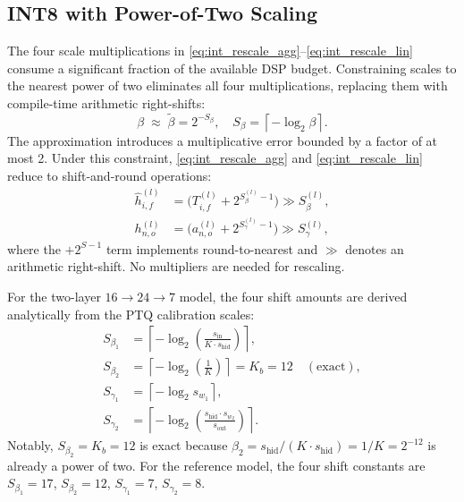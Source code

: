 \documentclass{IEEEtran}
\begin{document}
\subsection{INT8 with Power-of-Two Scaling}
\label{sec:po2}

The four scale multiplications in \eqref{eq:int_rescale_agg}--\eqref{eq:int_rescale_lin} consume a significant fraction of the available DSP budget. Constraining scales to the nearest power of two eliminates all four multiplications, replacing them with compile-time arithmetic right-shifts:
\begin{equation}
    \beta \;\approx\; \tilde{\beta} = 2^{-S_\beta},\quad
    S_\beta = \left\lceil -\log_2\beta \right\rceil.
    \label{eq:po2_approx}
\end{equation}
The approximation introduces a multiplicative error bounded by a factor of at most 2. Under this constraint, \eqref{eq:int_rescale_agg} and \eqref{eq:int_rescale_lin} reduce to shift-and-round operations:
\begin{align}
    \hat{h}_{i,f}^{(l)} &= \bigl(T_{i,f}^{(l)} + 2^{S_{\beta}^{(l)}-1}\bigr) \gg S_{\beta}^{(l)}, \label{eq:po2_agg}\\
    h_{n,o}^{(l)} &= \bigl(a_{n,o}^{(l)} + 2^{S_{\gamma}^{(l)}-1}\bigr) \gg S_{\gamma}^{(l)}, \label{eq:po2_lin}
\end{align}
where the $+2^{S-1}$ term implements round-to-nearest and $\gg$ denotes an arithmetic right-shift. No multipliers are needed for rescaling.

For the two-layer $16{\to}24{\to}7$ model, the four shift amounts are derived analytically from the PTQ calibration scales:
\begin{align}
    S_{\beta_1} &= \left\lceil-\log_2\!\left(\tfrac{s_{\mathrm{in}}}{K\cdot s_{\mathrm{hid}}}\right)\right\rceil, \label{eq:shift_beta1}\\
    S_{\beta_2} &= \left\lceil-\log_2\!\left(\tfrac{1}{K}\right)\right\rceil = K_b = 12\quad(\text{exact}), \label{eq:shift_beta2}\\
    S_{\gamma_1} &= \left\lceil-\log_2 s_{w_1}\right\rceil, \label{eq:shift_gamma1}\\
    S_{\gamma_2} &= \left\lceil-\log_2\!\left(\tfrac{s_{\mathrm{hid}}\cdot s_{w_2}}{s_{\mathrm{out}}}\right)\right\rceil. \label{eq:shift_gamma2}
\end{align}
Notably, $S_{\beta_2}=K_b=12$ is exact because $\beta_2 = s_{\mathrm{hid}}/(K\cdot s_{\mathrm{hid}}) = 1/K = 2^{-12}$ is already a power of two. For the reference model, the four shift constants are $S_{\beta_1}=17$, $S_{\beta_2}=12$, $S_{\gamma_1}=7$, $S_{\gamma_2}=8$.
\end{document}
